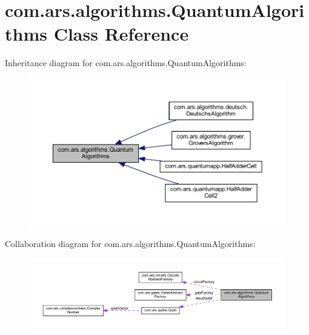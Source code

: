 \hypertarget{classcom_1_1ars_1_1algorithms_1_1_quantum_algorithms}{}\section{com.\+ars.\+algorithms.\+Quantum\+Algorithms Class Reference}
\label{classcom_1_1ars_1_1algorithms_1_1_quantum_algorithms}


Inheritance diagram for com.\+ars.\+algorithms.\+Quantum\+Algorithms\+:
\nopagebreak
\begin{figure}[H]
\begin{center}
\leavevmode
\includegraphics[width=350pt]{classcom_1_1ars_1_1algorithms_1_1_quantum_algorithms__inherit__graph}
\end{center}
\end{figure}


Collaboration diagram for com.\+ars.\+algorithms.\+Quantum\+Algorithms\+:
\nopagebreak
\begin{figure}[H]
\begin{center}
\leavevmode
\includegraphics[width=350pt]{classcom_1_1ars_1_1algorithms_1_1_quantum_algorithms__coll__graph}
\end{center}
\end{figure}
